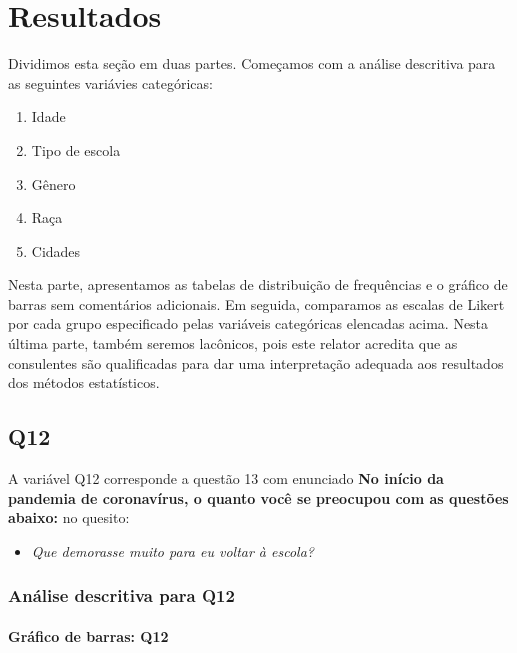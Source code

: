 \documentclass[]{article}
\providecommand{\tightlist}{%
  \setlength{\itemsep}{0pt}\setlength{\parskip}{0pt}}
\let\oldparagraph\paragraph
\renewcommand{\paragraph}[1]{\oldparagraph{#1}\mbox{}}
\begin{document}
\cleardoublepage

\hypertarget{resultados}{%
\section{Resultados}\label{resultados}}

Dividimos esta seção em duas partes. Começamos com a análise descritiva para as seguintes variávies categóricas:

\begin{enumerate}
\def\labelenumi{\roman{enumi}.}
\tightlist
\item
  Idade
\item
  Tipo de escola
\item
  Gênero
\item
  Raça
\item
  Cidades
\end{enumerate}

Nesta parte, apresentamos as tabelas de distribuição de frequências e o gráfico de barras sem comentários adicionais. Em seguida, comparamos as escalas de Likert por cada grupo especificado pelas variáveis categóricas elencadas acima. Nesta última parte, também seremos lacônicos, pois este relator acredita que as consulentes são qualificadas para dar uma interpretação adequada aos resultados dos métodos estatísticos.

\cleardoublepage

\hypertarget{q12}{%
\subsection{Q12}\label{q12}}

A variável Q12 corresponde a questão 13 com enunciado \textbf{No início da pandemia de coronavírus, o quanto você se preocupou com as questões abaixo:} no quesito:

\begin{itemize}
\tightlist
\item
  \emph{Que demorasse muito para eu voltar à escola?}
\end{itemize}

\hypertarget{anuxe1lise-descritiva-para-q12}{%
\subsubsection{Análise descritiva para Q12}\label{anuxe1lise-descritiva-para-q12}}

\hypertarget{gruxe1fico-de-barras-q12}{%
\paragraph{Gráfico de barras: Q12}\label{gruxe1fico-de-barras-q12}}
\end{document}
